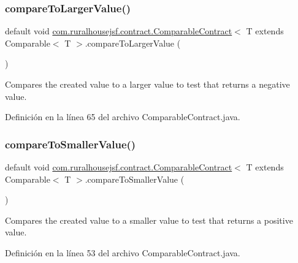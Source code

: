\subsubsection{\texorpdfstring{compareToLargerValue()}{compareToLargerValue()}}
{\footnotesize\ttfamily default void \mbox{\hyperlink{interfacecom_1_1ruralhousejsf_1_1contract_1_1_comparable_contract}{com.\+ruralhousejsf.\+contract.\+Comparable\+Contract}}$<$ T extends Comparable$<$ T $>$.compare\+To\+Larger\+Value (\begin{DoxyParamCaption}{ }\end{DoxyParamCaption})}

Compares the created value to a larger value to test that returns a negative value. 

Definición en la línea 65 del archivo Comparable\+Contract.\+java.

\mbox{\label{interfacecom_1_1ruralhousejsf_1_1contract_1_1_comparable_contract_aa5df8ced74d7707d219de7d79eb04cb1}} 
\subsubsection{\texorpdfstring{compareToSmallerValue()}{compareToSmallerValue()}}
{\footnotesize\ttfamily default void \mbox{\hyperlink{interfacecom_1_1ruralhousejsf_1_1contract_1_1_comparable_contract}{com.\+ruralhousejsf.\+contract.\+Comparable\+Contract}}$<$ T extends Comparable$<$ T $>$.compare\+To\+Smaller\+Value (\begin{DoxyParamCaption}{ }\end{DoxyParamCaption})}

Compares the created value to a smaller value to test that returns a positive value. 

Definición en la línea 53 del archivo Comparable\+Contract.\+java.

\mbox{\label{interfacecom_1_1ruralhousejsf_1_1contract_1_1_comparable_contract_a63e1e8c46f202f132c7f15b51a11ee27}} 
